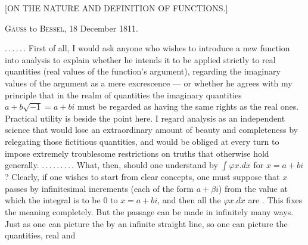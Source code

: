 \clearpage
{}%

\begin{center}
\large [ON THE NATURE AND DEFINITION OF FUNCTIONS.]
\end{center}

\begin{center}
\textsc{Gauss} to \textsc{Bessel}, 18 December 1811.
\end{center}

\noindent\hspace*{\parindent}$\mathord{.}\,\mathord{.}\,\mathord{.}\,\mathord{.}\,\mathord{.}\,\mathord{.}$ First of all, I would ask anyone who wishes to introduce a new function into analysis to explain whether he intends it to be applied strictly to real quantities (real values of the function's argument), regarding the imaginary values of the argument as a mere excrescence --- or whether he agrees with my principle that in the realm of quantities the imaginary quantities $a+b\sqrt{-1}=a+bi$ must be regarded as having the same rights as the real ones. Practical utility is beside the point here. I regard analysis as an independent science that would lose an extraordinary amount of beauty and completeness by relegating those fictitious quantities, and would be obliged at every turn to impose extremely troublesome restrictions on truths that otherwise hold generally. $\mathord{.}\,\mathord{.}\,\mathord{.}\,\mathord{.}\,\mathord{.}\,\mathord{.}\,\mathord{.}\,\mathord{.}\,\mathord{.}$ What, then, should one understand by $\int \varphi x\mathord{.} dx$ for $x=a+bi$? Clearly, if one wishes to start from clear concepts, one must suppose that $x$ passes by infinitesimal increments (each of the form $a+\beta i$) from the value at which the integral is to be 0 to $x=a+bi$, and then all the $\varphi x\mathord{.} dx$ are . This fixes the meaning completely. But the passage can be made in infinitely many ways. Just as one can picture the  by an infinite straight line, so one can picture the  quantities, real and
